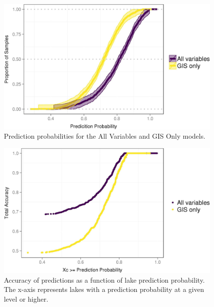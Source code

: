 \documentclass[12pt,]{article}
\begin{document}
\newpage

\begin{figure}[htbp]
\centering
\includegraphics{manuscript_files/figure-latex/prob_cdf-1.jpeg}
\caption{Prediction probabilities for the All Variables and GIS Only
models. \label{fig:prob_cdf}}
\end{figure}

\newpage

\begin{figure}[htbp]
\centering
\includegraphics{manuscript_files/figure-latex/cond_prob_fig-1.jpeg}
\caption{Accuracy of predictions as a function of lake prediction
probability. The x-axis represents lakes with a prediction probability
at a given level or higher. \label{fig:cond_prob_fig}}
\end{figure}

\newpage
\end{document}
